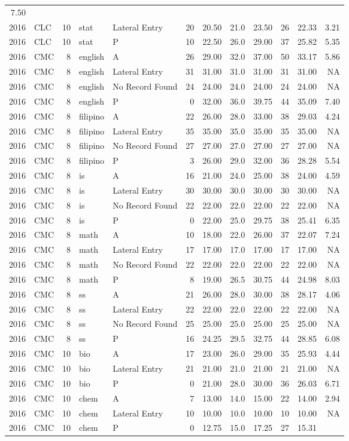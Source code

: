 \documentclass[]{article}
\begin{document}
\begin{longtable}[]{@{}rlrllrrrrrrr@{}}
7.50\tabularnewline
2016 & CLC & 10 & stat & Lateral Entry & 20 & 20.50 & 21.0 & 23.50 & 26
& 22.33 & 3.21\tabularnewline
2016 & CLC & 10 & stat & P & 10 & 22.50 & 26.0 & 29.00 & 37 & 25.82 &
5.35\tabularnewline
2016 & CMC & 8 & english & A & 26 & 29.00 & 32.0 & 37.00 & 50 & 33.17 &
5.86\tabularnewline
2016 & CMC & 8 & english & Lateral Entry & 31 & 31.00 & 31.0 & 31.00 &
31 & 31.00 & NA\tabularnewline
2016 & CMC & 8 & english & No Record Found & 24 & 24.00 & 24.0 & 24.00 &
24 & 24.00 & NA\tabularnewline
2016 & CMC & 8 & english & P & 0 & 32.00 & 36.0 & 39.75 & 44 & 35.09 &
7.40\tabularnewline
2016 & CMC & 8 & filipino & A & 22 & 26.00 & 28.0 & 33.00 & 38 & 29.03 &
4.24\tabularnewline
2016 & CMC & 8 & filipino & Lateral Entry & 35 & 35.00 & 35.0 & 35.00 &
35 & 35.00 & NA\tabularnewline
2016 & CMC & 8 & filipino & No Record Found & 27 & 27.00 & 27.0 & 27.00
& 27 & 27.00 & NA\tabularnewline
2016 & CMC & 8 & filipino & P & 3 & 26.00 & 29.0 & 32.00 & 36 & 28.28 &
5.54\tabularnewline
2016 & CMC & 8 & is & A & 16 & 21.00 & 24.0 & 25.00 & 38 & 24.00 &
4.59\tabularnewline
2016 & CMC & 8 & is & Lateral Entry & 30 & 30.00 & 30.0 & 30.00 & 30 &
30.00 & NA\tabularnewline
2016 & CMC & 8 & is & No Record Found & 22 & 22.00 & 22.0 & 22.00 & 22 &
22.00 & NA\tabularnewline
2016 & CMC & 8 & is & P & 0 & 22.00 & 25.0 & 29.75 & 38 & 25.41 &
6.35\tabularnewline
2016 & CMC & 8 & math & A & 10 & 18.00 & 22.0 & 26.00 & 37 & 22.07 &
7.24\tabularnewline
2016 & CMC & 8 & math & Lateral Entry & 17 & 17.00 & 17.0 & 17.00 & 17 &
17.00 & NA\tabularnewline
2016 & CMC & 8 & math & No Record Found & 22 & 22.00 & 22.0 & 22.00 & 22
& 22.00 & NA\tabularnewline
2016 & CMC & 8 & math & P & 8 & 19.00 & 26.5 & 30.75 & 44 & 24.98 &
8.03\tabularnewline
2016 & CMC & 8 & ss & A & 21 & 26.00 & 28.0 & 30.00 & 38 & 28.17 &
4.06\tabularnewline
2016 & CMC & 8 & ss & Lateral Entry & 22 & 22.00 & 22.0 & 22.00 & 22 &
22.00 & NA\tabularnewline
2016 & CMC & 8 & ss & No Record Found & 25 & 25.00 & 25.0 & 25.00 & 25 &
25.00 & NA\tabularnewline
2016 & CMC & 8 & ss & P & 16 & 24.25 & 29.5 & 32.75 & 44 & 28.85 &
6.08\tabularnewline
2016 & CMC & 10 & bio & A & 17 & 23.00 & 26.0 & 29.00 & 35 & 25.93 &
4.44\tabularnewline
2016 & CMC & 10 & bio & Lateral Entry & 21 & 21.00 & 21.0 & 21.00 & 21 &
21.00 & NA\tabularnewline
2016 & CMC & 10 & bio & P & 0 & 21.00 & 28.0 & 30.00 & 36 & 26.03 &
6.71\tabularnewline
2016 & CMC & 10 & chem & A & 7 & 13.00 & 14.0 & 15.00 & 22 & 14.00 &
2.94\tabularnewline
2016 & CMC & 10 & chem & Lateral Entry & 10 & 10.00 & 10.0 & 10.00 & 10
& 10.00 & NA\tabularnewline
2016 & CMC & 10 & chem & P & 0 & 12.75 & 15.0 & 17.25 & 27 & 15.31 &

\end{longtable}
\end{document}

